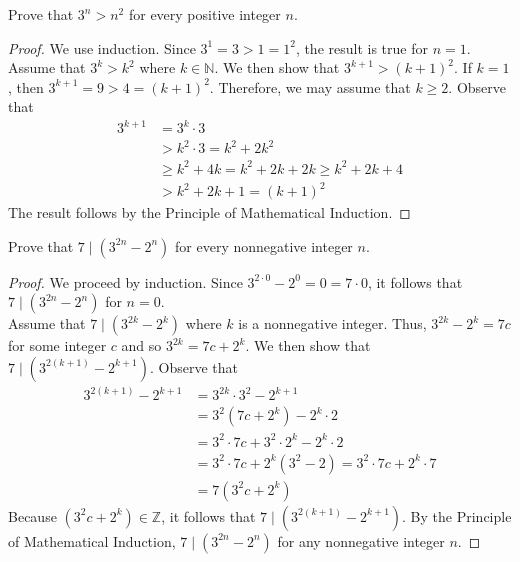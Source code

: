 \documentclass[12pt]{article}
\newcommand{\N}{\mathbb{N}}
\newcommand{\Z}{\mathbb{Z}}
\newenvironment{problem}[2][Problem]{\begin{trivlist}
		\item[\hskip \labelsep {\bfseries #1}\hskip \labelsep {\bfseries #2.}]}{\end{trivlist}}
\begin{document}
\begin{problem}{22}
	Prove that $3^{n}>n^{2}$ for every positive integer $n$.
	\begin{proof}
		We use induction. Since $3^{1} = 3>1=1^{2}$, the result is true for $n=1$. Assume that $3^{k} > k^{2}$ where $k\in \N$. We then show that $3^{k+1}>(k+1)^{2}$. If $k=1$, then $3^{k+1} = 9 > 4 = (k+1)^{2}$. Therefore, we may assume that $k\geq 2$. Observe that 
		\begin{align*}
			3^{k+1} &= 3^{k}\cdot 3\\
			&> k^{2}\cdot 3 = k^{2} + 2k^{2}\\
			&\geq k^{2} + 4k = k^{2}+2k+2k \geq  k^{2}+2k+4\\
			&> k^{2}+2k+1 = (k+1)^{2}
		\end{align*}
	The result follows by the Principle of Mathematical Induction.
	\end{proof}
\end{problem}

\begin{problem}{23}
	Prove that $7 \mid (3^{2n}-2^{n})$ for every nonnegative integer $n$.
	\begin{proof}
		We proceed by induction. Since $3^{2\cdot 0}-2^{0} = 0 = 7\cdot 0$, it follows that $7 \mid (3^{2n}-2^{n})$ for $n=0$.\\
		Assume that $7 \mid (3^{2k}-2^{k})$ where $k$ is a nonnegative integer. Thus, $3^{2k} - 2^{k} = 7c$ for some integer $c$ and so $3^{2k} = 7c + 2^{k}$. We then show that $7 \mid (3^{2(k+1)} - 2^{k+1})$. Observe that
		\begin{align*}
			3^{2(k+1)}-2^{k+1} &= 3^{2k}\cdot3^{2} - 2^{k+1}\\
			&= 3^{2}(7c + 2^{k}) - 2^{k}\cdot 2\\
			&= 3^{2}\cdot 7c + 3^{2}\cdot 2^{k} -2^{k}\cdot 2\\
			&= 3^{2}\cdot 7c + 2^{k}(3^{2}-2) = 3^{2}\cdot 7c +2^{k}\cdot 7\\
			&= 7(3^{2}c + 2^{k})
		\end{align*} 
	Because $(3^{2}c + 2^{k})\in \Z$, it follows that $7\mid (3^{2(k+1)} - 2^{k+1})$. By the Principle of Mathematical Induction, $7 \mid (3^{2n}-2^{n})$ for any nonnegative integer $n$.
	\end{proof}
\end{problem}
\end{document}
